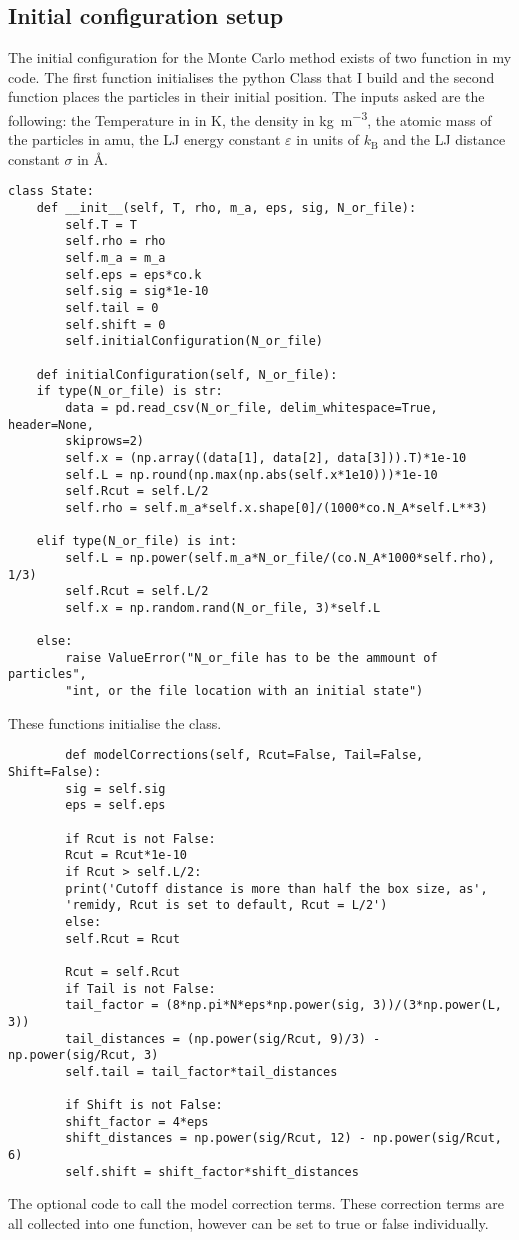 \subsection{Initial configuration setup}
The initial configuration for the Monte Carlo method exists of two function in my code. The first function initialises the python Class that I build and the second function places the particles in their initial position. The inputs asked are the following:
the Temperature in in \si{\K}, the density in \si{\kg\per\m^3}, the atomic mass of the particles in amu, the LJ energy constant $\varepsilon$ in units of $k_\text{B}$ and the LJ distance constant $\sigma$ in \si{\angstrom}.

\begin{listing}[ht!]
	\begin{verbatim}
class State:
	def __init__(self, T, rho, m_a, eps, sig, N_or_file):
		self.T = T
		self.rho = rho
		self.m_a = m_a
		self.eps = eps*co.k
		self.sig = sig*1e-10
		self.tail = 0
		self.shift = 0
		self.initialConfiguration(N_or_file)
	
	def initialConfiguration(self, N_or_file):
	if type(N_or_file) is str:
		data = pd.read_csv(N_or_file, delim_whitespace=True, header=None,
		skiprows=2)
		self.x = (np.array((data[1], data[2], data[3])).T)*1e-10
		self.L = np.round(np.max(np.abs(self.x*1e10)))*1e-10
		self.Rcut = self.L/2
		self.rho = self.m_a*self.x.shape[0]/(1000*co.N_A*self.L**3)
	
	elif type(N_or_file) is int:
		self.L = np.power(self.m_a*N_or_file/(co.N_A*1000*self.rho), 1/3)
		self.Rcut = self.L/2
		self.x = np.random.rand(N_or_file, 3)*self.L
	
	else:
		raise ValueError("N_or_file has to be the ammount of particles",
		"int, or the file location with an initial state")
	\end{verbatim}
\caption{These functions initialise the class.}
	\label{Initialisation code}
\end{listing}

\begin{listing}[ht!]
	\begin{verbatim}
		def modelCorrections(self, Rcut=False, Tail=False, Shift=False):
		sig = self.sig
		eps = self.eps
		
		if Rcut is not False:
		Rcut = Rcut*1e-10
		if Rcut > self.L/2:
		print('Cutoff distance is more than half the box size, as',
		'remidy, Rcut is set to default, Rcut = L/2')
		else:
		self.Rcut = Rcut
		
		Rcut = self.Rcut
		if Tail is not False:
		tail_factor = (8*np.pi*N*eps*np.power(sig, 3))/(3*np.power(L, 3))
		tail_distances = (np.power(sig/Rcut, 9)/3) - np.power(sig/Rcut, 3)
		self.tail = tail_factor*tail_distances
		
		if Shift is not False:
		shift_factor = 4*eps
		shift_distances = np.power(sig/Rcut, 12) - np.power(sig/Rcut, 6)
		self.shift = shift_factor*shift_distances
	\end{verbatim}
\caption{The optional code to call the model correction terms. These correction terms are all collected into one function, however can be set to true or false individually.}
	\label{Model correction code}
\end{listing}

